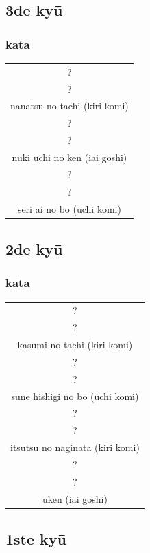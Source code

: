 \documentclass[12pt]{scrartcl}
\begin{document}
\begin{CJK*}{UTF8}{min}
\subsection{3de ky\={u}}
\subsubsection{kata}
\begin{table}[H]
\begin{center}
\begin{tabular}{c}
?\\
?\\
nanatsu no tachi (kiri komi)\\
\hline
?\\
?\\
nuki uchi no ken (iai goshi)\\
\hline
?\\
?\\
seri ai no bo (uchi komi)
\end{tabular}
\end{center}
\label{kyuu_3_katori_kata}
\end{table}

\subsection{2de ky\={u}}
\subsubsection{kata}
\begin{table}[H]
\begin{center}
\begin{tabular}{c}
?\\
?\\
kasumi no tachi (kiri komi)\\
\hline
?\\
?\\
sune hishigi no bo (uchi komi)\\
\hline
?\\
?\\
itsutsu no naginata (kiri komi)\\
\hline
?\\
?\\
uken (iai goshi)
\end{tabular}
\end{center}
\label{kyuu_2_katori_kata}
\end{table}

\subsection{1ste ky\={u}}

\end{CJK*}
\end{document}
